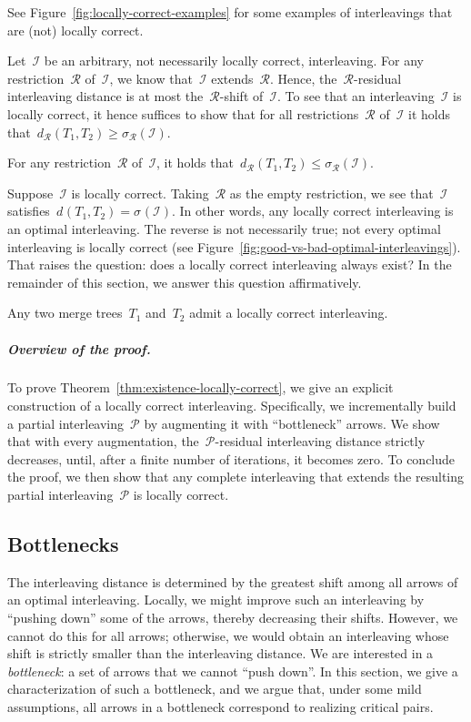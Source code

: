 \documentclass[a4paper,UKenglish, autoref, thm-restate, cleveref]{lipics-v2021}
\newcommand{\shift}[1]{\sigma_{#1}}
\newcommand{\intdist}[1]{d^{{#1}}}
\newcommand{\resdist}[1]{d_{#1}}
\newcommand{\I}{\mathcal{I}}
\renewcommand{\P}{\mathcal{P}}
\newcommand{\R}{\mathcal{R}}
\begin{document}
\noindent
See Figure~\ref{fig:locally-correct-examples} for some examples of interleavings that are (not) locally correct.

Let~$\I$ be an arbitrary, not necessarily locally correct, interleaving.
For any restriction~$\R$ of~$\I$, we know that~$\I$ extends~$\R$.
Hence, the~$\R$-residual interleaving distance is at most the~$\R$-shift of~$\I$.
To see that an interleaving~$\I$ is locally correct, it hence suffices to show that for all restrictions~$\R$ of~$\I$ it holds that~$\resdist{\R}(T_1, T_2) \ge \shift{\R}(\I)$.

\begin{observation}\label{obs:locally-correct}
	For any restriction~$\R$ of~$\I$, it holds that~$\resdist{\R}(T_1, T_2) \le \shift{\R}(\I)$.
\end{observation}

\noindent
Suppose~$\I$ is locally correct.
Taking~$\R$ as the empty restriction, we see that~$\I$ satisfies~$\intdist{}(T_1, T_2) = \shift{}(\I)$.
In other words, any locally correct interleaving is an optimal interleaving.
The reverse is not necessarily true; not every optimal interleaving is locally correct (see Figure~\ref{fig:good-vs-bad-optimal-interleavings}).
That raises the question: does a locally correct interleaving always exist?
In the remainder of this section, we answer this question affirmatively.

\begin{theorem}\label{thm:existence-locally-correct}
	Any two merge trees~$T_1$ and~$T_2$ admit a locally correct interleaving.
\end{theorem}

\subparagraph{Overview of the proof.}
To prove Theorem~\ref{thm:existence-locally-correct}, we give an explicit construction of a locally correct interleaving.
Specifically, we incrementally build a partial interleaving~$\P$ by augmenting it with ``bottleneck'' arrows.
We show that with every augmentation, the~$\P$-residual interleaving distance strictly decreases, until, after a finite number of iterations, it becomes zero.
To conclude the proof, we then show that any complete interleaving that extends the resulting partial interleaving~$\P$ is locally correct.

\subsection{Bottlenecks}\label{sec:bottlenecks}
The interleaving distance is determined by the greatest shift among all arrows of an optimal interleaving.
Locally, we might improve such an interleaving by ``pushing down'' some of the arrows, thereby decreasing their shifts. 
However, we cannot do this for all arrows; otherwise, we would obtain an interleaving whose shift is strictly smaller than the interleaving distance.
We are interested in a \emph{bottleneck}: a set of arrows that we cannot ``push down''.
In this section, we give a characterization of such a bottleneck, and we argue that, under some mild assumptions, all arrows in a bottleneck correspond to realizing critical pairs.
\end{document}

